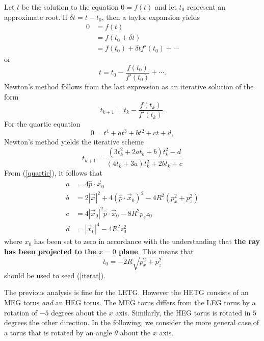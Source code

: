 \documentclass{article}
\newcommand{\eq}[1]{(\ref{#1})}
\newcommand{\p}{\hat{p}}
\newcommand{\x}{\vec{x}}
\begin{document}
 Let $t$ be the solution to the equation $0 = f(t)$ and let $t_0$ represent
 an approximate root.  If $\delta t = t - t_0$, then a taylor expansion yields
\begin{equation*}
\begin{split}
   0 &= f(t) \\
     &= f(t_0 + \delta t) \\
     &= f(t_0) + \delta t f'(t_0) + \cdots 
\end{split}
\end{equation*}
 or
\begin{equation} 
   t = t_0 - \frac{f(t_0)}{f'(t_0)} + \cdots.
\end{equation} 
 Newton's method follows from the last expression as an iterative solution
 of the form
\begin{equation} 
   t_{k+1} = t_k - \frac{f(t_k)}{f'(t_k)}. \label{newton}
\end{equation}
 For the quartic equation 
\begin{equation} 
  0 = t^4 + at^3 + bt^2 + ct + d,
\end{equation} 
 Newton's method yields the iterative scheme
\begin{equation} 
 t_{k+1} = \frac{(3t_k^2 + 2at_k + b)t_k^2 - d}%
                {(4t_k + 3a)t_k^2 + 2bt_k + c}  \label{iterat}
\end{equation}
 From \eq{quartic}, it follows that
\begin{equation}
\begin{split}
   a &= 4\p\cdot\x_0 \\
   b &= 2|\x|^2 + 4(\p\cdot\x_0)^2 - 4R^2(p_x^2 + p_z^2) \\
   c &= 4|\x_0|^2 \p\cdot\x_0 - 8R^2 p_z z_0 \\
   d &=  |\x_0|^4 - 4R^2 z_0^2  
\end{split}
\end{equation} 
 where $x_0$ has been set to zero in accordance with the understanding that
 {\bf the ray has been projected to the $x = 0$ plane}.  This means that
\begin{equation} 
   t_0 = -2R\sqrt{p_x^2 + p_z^2}
\end{equation} 
 should be used to seed \eq{iterat}.

 The previous analysis is fine for the LETG.  However the HETG consists of
 an MEG torus {\em and} an HEG torus.  The MEG torus differs from the LEG
 torus by a rotation of $-5$ degrees about the $x$ axis.  Similarly, the HEG
 torus is rotated in $5$ degrees the other direction.  In the following, we
 consider the more general case of a torus that is rotated by an angle
 $\theta$ about the $x$ axis.  
\end{document}
